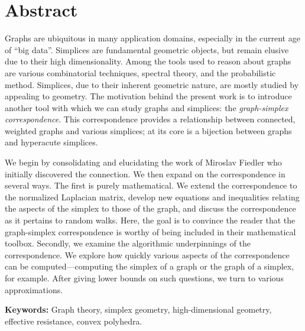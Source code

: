 \chapter*{Abstract}

Graphs are ubiquitous in many application  domains, especially in the current age of ``big data''. 
Simplices are fundamental geometric objects, but remain elusive due to their high dimensionality. Among the tools used  to  reason about graphs are various combinatorial techniques, spectral theory, and the probabilistic  method. Simplices,  due to their inherent geometric nature, are mostly studied  by appealing to  geometry. The motivation behind the present work is to introduce another tool with which  we can study graphs and simplices: the \emph{graph-simplex correspondence}. This correspondence provides a relationship between  connected, weighted graphs and  various simplices; at its core is a bijection between graphs and hyperacute simplices.  

We begin by consolidating and elucidating the work of Miroslav Fiedler who  initially discovered the connection. We then expand on the correspondence  in several  ways. The first is purely mathematical. We extend the correspondence to the normalized Laplacian matrix, develop new equations and  inequalities relating the aspects  of the simplex to those of the graph, and discuss the correspondence as it pertains to random walks. Here, the goal is to convince  the reader that the graph-simplex  correspondence is worthy of being  included in their mathematical  toolbox.  Secondly, we examine the algorithmic underpinnings of the correspondence. We explore how quickly various aspects of  the correspondence can be  computed---computing the simplex of a graph or the graph of a simplex, for example. After giving lower bounds on such questions, we turn to various  approximations.  

\vspace{1cm}
\noindent \textbf{Keywords:}  Graph theory,  simplex geometry, high-dimensional  geometry, effective resistance,  convex  polyhedra. 




